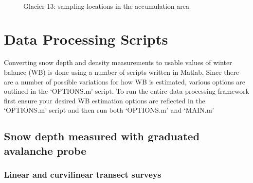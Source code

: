 \documentclass{sfuthesis}
\begin{document}
{\begin{appendices}
\begin{figure}[H]
	\\
\caption[]{Glacier 13: sampling locations in the accumulation area}
\end{figure}


\chapter{Data Processing Scripts}
\label{app:DataProcessingScripts}

Converting snow depth and density measurements to usable values of winter balance (WB) is done using a number of scripts written in Matlab. Since there are a number of possible variations for how WB is estimated, various options are outlined in the `OPTIONS.m' script. To run the entire data processing framework first ensure your desired WB estimation options are reflected in the `OPTIONS.m' script and then run both `OPTIONS.m' and `MAIN.m'

\section{Snow depth measured with graduated avalanche probe}
\subsection{Linear and curvilinear transect surveys}


\end{appendices}}
\end{document}
